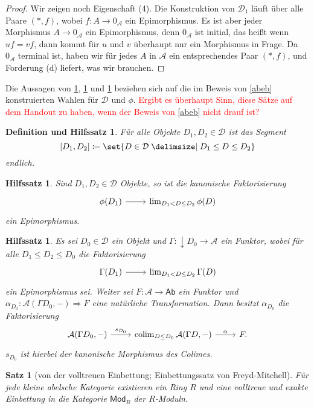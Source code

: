 \documentclass[a4paper, parskip=half]{scrartcl}
\theoremstyle{marginbreak}
\newtheorem{theorem}[remark]{Satz}
\newtheorem{lemma}[remark]{Hilfssatz}
\newtheorem{defle}[remark]{Definition und Hilfssatz}
\theoremstyle{nonumberplain}
\newtheorem{proof}{Beweis.}
\newcommand\ccat\mathsf
\newcommand\cat\mathcal
\newcommand{\down}[1]{{\downarrow}#1}
\DeclareMathOperator{\colim}{colim}
\begin{document}
{\begin{proof}
			Wir zeigen noch Eigenschaft (4). Die Konstruktion von $\cat{D}_1$ läuft
			über alle Paare $(*, f)$, wobei $f\colon A\to 0_\cat{A}$ ein Epimorphismus.
			Es ist aber jeder Morphismus $A\to 0_\cat{A}$ ein Epimorphismus, denn
			$0_\cat{A}$ ist initial, das heißt wenn $uf=vf$, dann kommt für $u$ und $v$
			überhaupt nur ein Morphismus in Frage. Da $0_\cat{A}$ terminal ist,
			haben wir für jedes $A$ in $\cat{A}$ ein entsprechendes Paar $(*, f)$,
			und Forderung (d) liefert, was wir brauchen.
		\end{proof}}

		Die Aussagen von \ref{fin}, \ref{fact} und \ref{func} beziehen sich auf
		die im Beweis von \ref{abeb} konstruierten
		Wahlen für $\cat{D}$ und $\phi$. \textcolor{red}{Ergibt es überhaupt Sinn,
		diese Sätze auf dem Handout zu haben, wenn der Beweis von \ref{abeb}
		nicht drauf ist?}
		\begin{defle}\label{fin}
			Für alle Objekte $D_1,D_2\in\cat{D}$ ist das Segment
				\[
					[D_1, D_2] \coloneqq\set{D\in\cat{D}\given D_1\leq D\leq D_2}
				\]
			endlich.
		\end{defle}
		\begin{lemma}\label{fact}
			Sind $D_1, D_2\in\cat{D}$ Objekte, so ist die kanonische Faktorisierung
			\[
				\begin{tikzcd}
					\phi(D_1) \arrow[r] & \lim_{D_1<D\leq D_2}\phi(D)
				\end{tikzcd}
			\]
			ein Epimorphismus.
		\end{lemma}
		\begin{lemma}\label{func}
			Es sei $D_0\in\cat{D}$ ein Objekt und $\Gamma\colon \down{D_0}\to\cat{A}$
			ein Funktor, wobei für alle $D_1\leq D_2\leq D_0$ die Faktorisierung
			\[
				\begin{tikzcd}
					\Gamma(D_1) \arrow[r] & \lim_{D_1<D\leq D_2} \Gamma(D)
				\end{tikzcd}
			\]
			ein Epimorphismus sei. Weiter sei $F\colon\cat{A}\to\ccat{Ab}$ ein
			Funktor und $\alpha_{D_0}\colon \cat{A}(\Gamma D_0, {-})\Rightarrow F$
			eine natürliche Transformation. Dann besitzt $\alpha_{D_0}$ die
			Faktorisierung
			\[
				\begin{tikzcd}
					\cat{A}(\Gamma D_0, {-}) \arrow{r}{s_{D_0}} & \colim_{D\leq D_0}\cat{A}(\Gamma D, {-}) \arrow{r}{\alpha} & F.
				\end{tikzcd}
			\]
			$s_{D_0}$ ist hierbei der kanonische Morphismus des Colimes.
		\end{lemma}
		\begin{theorem}[von der volltreuen Einbettung; Einbettungssatz von Freyd-Mitchell]
			Für jede kleine abelsche Kategorie existieren ein Ring $R$ und eine volltreue
			und exakte Einbettung in die Kategorie $\ccat{Mod}_R$ der $R$-Moduln.
		\end{theorem}
\end{document}
